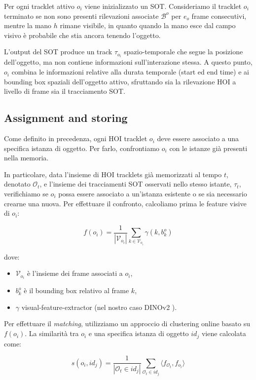 Per ogni tracklet attivo $o_i$ viene inizializzato un SOT. Consideriamo il tracklet $o_i$ terminato se non sono presenti rilevazioni associate $\mathcal{B}^o$ per $e_o$ frame consecutivi, mentre la mano $h$ rimane visibile, in quanto quando la mano esce dal campo visivo è probabile che stia ancora tenendo l'oggetto.

L'output del SOT produce un track $\tau_{o_i}$ spazio-temporale che segue la posizione dell'oggetto, ma non contiene informazioni sull'interazione stessa. A questo punto, $o_i$ combina le informazioni relative alla durata temporale (start ed end time) e ai bounding box spaziali dell'oggetto attivo, sfruttando sia la rilevazione HOI a livello di frame sia il tracciamento SOT.

\subsection*{Assignment and storing}

Come definito in precedenza, ogni HOI tracklet $o_i$ deve essere associato a una specifica istanza di oggetto. Per farlo, confrontiamo $o_i$ con le istanze già presenti nella memoria.  

In particolare, data l'insieme di HOI tracklets già memorizzati al tempo $t$, denotato $\mathcal{O}_t$, e l'insieme dei tracciamenti SOT osservati nello stesso istante, $\tau_t$, verifichiamo se $o_i$ possa essere associato a un'istanza esistente o se sia necessario crearne una nuova. Per effettuare il confronto, calcoliamo prima le feature visive di $o_i$:

\[
f(o_i) = \frac{1}{|\mathcal{V}_{o_i}|} \sum_{k \in \mathcal{V}_{o_i}} \gamma(k, b_k^o)
\]

dove:
\begin{itemize}
    \item $\mathcal{V}_{o_i}$ è l'insieme dei frame associati a $o_i$,
    \item $b_k^o$ è il bounding box relativo al frame $k$,
    \item $\gamma$ visual-feature-extractor (nel nostro caso DINOv2 \cite{oquab2024dinov2learningrobustvisual}).
\end{itemize}

Per effettuare il \emph{matching}, utilizziamo un approccio di clustering online basato su $f(o_i)$. La similarità tra $o_i$ e una specifica istanza di oggetto $id_j$ viene calcolata come:

\[
s(o_i, id_j) = \frac{1}{|\mathcal{O}_t \in id_j|} \sum_{\mathcal{O}_t \in id_j} \langle f_{\mathcal{O}_t}, f_{o_i} \rangle
\]

